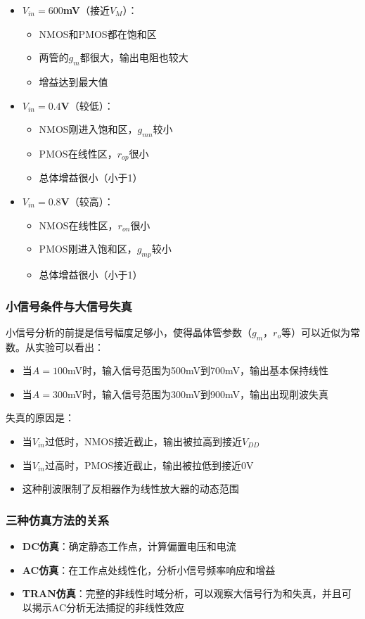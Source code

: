 \documentclass[UTF8,12pt,a4paper]{ctexart}
\begin{document}
\begin{itemize}
\item \textbf{$V_{in} = 600$mV}（接近$V_M$）：
  \begin{itemize}
  \item NMOS和PMOS都在饱和区
  \item 两管的$g_m$都很大，输出电阻也较大
  \item 增益达到最大值
  \end{itemize}

\item \textbf{$V_{in} = 0.4$V}（较低）：
  \begin{itemize}
  \item NMOS刚进入饱和区，$g_{mn}$较小
  \item PMOS在线性区，$r_{op}$很小
  \item 总体增益很小（小于1）
  \end{itemize}

\item \textbf{$V_{in} = 0.8$V}（较高）：
  \begin{itemize}
  \item NMOS在线性区，$r_{on}$很小
  \item PMOS刚进入饱和区，$g_{mp}$较小
  \item 总体增益很小（小于1）
  \end{itemize}
\end{itemize}

\subsubsection{小信号条件与大信号失真}
小信号分析的前提是信号幅度足够小，使得晶体管参数（$g_m$，$r_o$等）可以近似为常数。从实验可以看出：
\begin{itemize}
\item 当$A = 100$mV时，输入信号范围为500mV到700mV，输出基本保持线性
\item 当$A = 300$mV时，输入信号范围为300mV到900mV，输出出现削波失真
\end{itemize}

失真的原因是：
\begin{itemize}
\item 当$V_{in}$过低时，NMOS接近截止，输出被拉高到接近$V_{DD}$
\item 当$V_{in}$过高时，PMOS接近截止，输出被拉低到接近0V
\item 这种削波限制了反相器作为线性放大器的动态范围
\end{itemize}

\subsubsection{三种仿真方法的关系}
\begin{itemize}
\item \textbf{DC仿真}：确定静态工作点，计算偏置电压和电流
\item \textbf{AC仿真}：在工作点处线性化，分析小信号频率响应和增益
\item \textbf{TRAN仿真}：完整的非线性时域分析，可以观察大信号行为和失真，并且可以揭示AC分析无法捕捉的非线性效应
\end{itemize}
\end{document}
